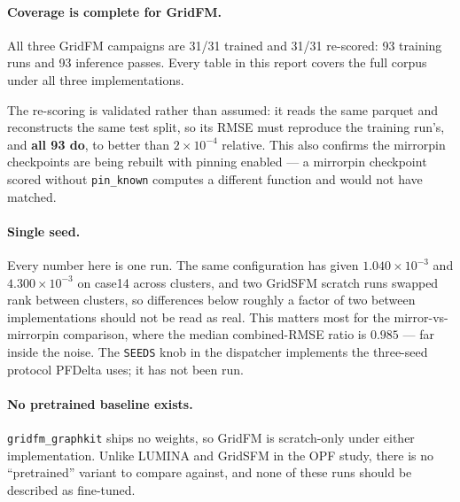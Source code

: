 \documentclass[10pt]{article}
\begin{document}
\paragraph{Coverage is complete for GridFM.} All three GridFM campaigns are 31/31 trained and
31/31 re-scored: 93 training runs and 93 inference passes. Every table in this
report covers the full corpus under all three implementations.

The re-scoring is validated rather than assumed: it reads the same parquet and
reconstructs the same test split, so its RMSE must reproduce the training run's,
and \textbf{all 93 do}, to better than $2\times10^{-4}$ relative. This also
confirms the mirrorpin checkpoints are being rebuilt with pinning enabled --- a
mirrorpin checkpoint scored without \texttt{pin\_known} computes a different
function and would not have matched.

\paragraph{Single seed.} Every number here is one run. The same configuration
has given $1.040\times10^{-3}$ and $4.300\times10^{-3}$ on case14 across
clusters, and two GridSFM scratch runs swapped rank between clusters, so
differences below roughly a factor of two between implementations should not be
read as real. This matters most for the mirror-vs-mirrorpin comparison, where
the median combined-RMSE ratio is $0.985$ --- far inside the noise. The
\texttt{SEEDS} knob in the dispatcher implements the three-seed protocol PFDelta
uses; it has not been run.

\paragraph{No pretrained baseline exists.} \texttt{gridfm\_graphkit} ships no
weights, so GridFM is scratch-only under either implementation. Unlike LUMINA
and GridSFM in the OPF study, there is no ``pretrained'' variant to compare
against, and none of these runs should be described as fine-tuned.
\end{document}
